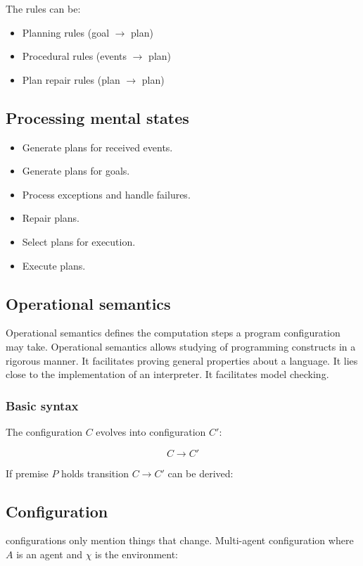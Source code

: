 \documentclass{article}
\begin{document}
\noindent
The rules can be:

\begin{itemize}
	\item Planning rules (goal $\to$ plan)
	\item Procedural rules (events $\to$ plan)
	\item Plan repair rules (plan $\to$ plan)
\end{itemize}

\subsection{Processing mental states}

\begin{itemize}
	\item Generate plans for received events.
	\item Generate plans for goals.
	\item Process exceptions and handle failures.
	\item Repair plans.
	\item Select plans for execution.
	\item Execute plans.
\end{itemize}

\subsection{Operational semantics}
Operational semantics defines the computation steps a program
configuration may take. Operational semantics allows studying
of programming constructs in a rigorous manner. It facilitates proving
general properties about a language. It lies close to the implementation
of an interpreter. It facilitates model checking.

\subsubsection{Basic syntax}
The configuration $C$ evolves into configuration $C'$:

\[C \to C'\]

If premise $P$ holds transition $C \to C'$ can be derived:

\begin{prooftree}
\end{prooftree}

\subsection{Configuration}
configurations only mention things that change.
Multi-agent configuration where $A$ is an agent and $\chi$ is the
environment:
\end{document}
